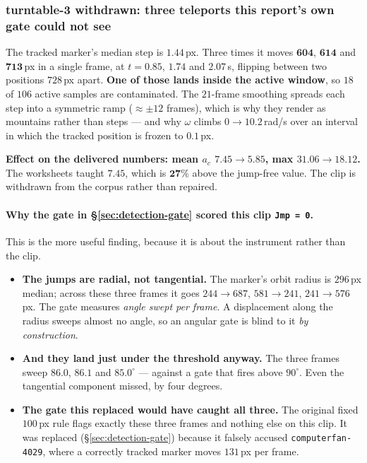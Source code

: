 \documentclass[11pt,a4paper]{article}
\begin{document}
\subsubsection{turntable-3 withdrawn: three teleports this report's own gate could not see}
\label{sec:tt3-jumps}

The tracked marker's median step is $\mathbf{1.44}$\,px. Three times it moves
$\mathbf{604}$, $\mathbf{614}$ and $\mathbf{713}$\,px in a single frame, at $t = 0.85$, $1.74$
and $2.07$\,s, flipping between two positions $728$\,px apart. \textbf{One of those lands inside
the active window}, so $18$ of $106$ active samples are contaminated. The $21$-frame smoothing
spreads each step into a symmetric ramp ($\approx\pm12$ frames), which is why they render as
mountains rather than steps --- and why $\omega$ climbs $0 \to 10.2$\,rad/s over an interval in
which the tracked position is frozen to $0.1$\,px.

\textbf{Effect on the delivered numbers: mean $a_c$ $7.45 \to 5.85$, max $31.06 \to 18.12$.} The
worksheets taught $7.45$, which is $\mathbf{27\%}$ above the jump-free value. The clip is
withdrawn from the corpus rather than repaired.

\paragraph{Why the gate in \S\ref{sec:detection-gate} scored this clip \texttt{Jmp = 0}.}
This is the more useful finding, because it is about the instrument rather than the clip.

\begin{itemize}
  \item \textbf{The jumps are radial, not tangential.} The marker's orbit radius is $296$\,px
  median; across these three frames it goes $244 \to 687$, $581 \to 241$, $241 \to 576$\,px. The
  gate measures \emph{angle swept per frame}. A displacement along the radius sweeps almost no
  angle, so an angular gate is blind to it \emph{by construction}.
  \item \textbf{And they land just under the threshold anyway.} The three frames sweep $86.0$,
  $86.1$ and $85.0^\circ$ --- against a gate that fires above $90^\circ$. Even the tangential
  component missed, by four degrees.
  \item \textbf{The gate this replaced would have caught all three.} The original fixed
  $100$\,px rule flags exactly these three frames and nothing else on this clip. It was replaced
  (\S\ref{sec:detection-gate}) because it falsely accused \texttt{computerfan-4029}, where a
  correctly tracked marker moves $131$\,px per frame.
\end{itemize}
\end{document}
